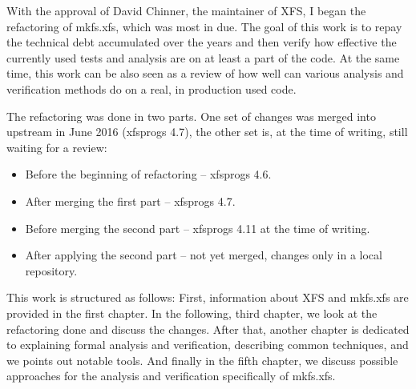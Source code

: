 With the approval of David Chinner, the maintainer of XFS, I began the
refactoring of mkfs.xfs, which was most in due. The goal of this work is to repay the technical debt accumulated over the years and then verify how effective the currently used tests and analysis are on at least a part of the code. At the same time, this work can be also seen as a review of how well can various analysis and verification methods do on a real, in production used code.

The refactoring was done in two parts. One set of changes was merged into upstream in June 2016 (xfsprogs 4.7), the other set is, at the time of writing, still waiting for a review:
\begin{itemize}
\item Before the beginning of refactoring -- xfsprogs 4.6.
\item After merging the first part -- xfsprogs 4.7.
\item Before merging the second part -- xfsprogs 4.11 at the time of writing.
\item After applying the second part -- not yet merged, changes only in a local repository.
\end{itemize}

This work is structured as follows: First, information about XFS and
mkfs.xfs are provided in the first chapter. In the following, third chapter, we look
at the refactoring done and discuss the changes. After that, another
chapter is dedicated to explaining formal analysis and verification,
describing common techniques, and we points out notable tools. And finally
in the fifth chapter, we discuss possible approaches for the analysis and
verification specifically of mkfs.xfs.

